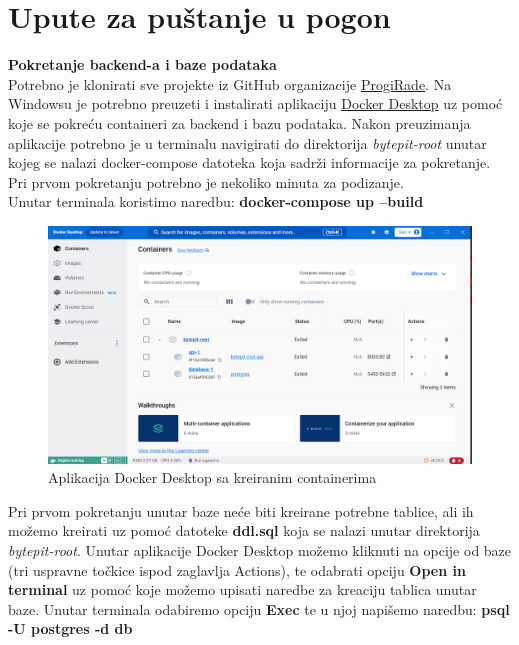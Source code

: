 		\section{Upute za puštanje u pogon}
		
			\textbf{Pokretanje backend-a i baze podataka}\\
			
				\noindent Potrebno je klonirati sve projekte iz GitHub organizacije \href{https://github.com/ProgiRade}{ProgiRade}. Na Windowsu je potrebno preuzeti i instalirati aplikaciju \href{https://www.docker.com/products/docker-desktop/}{Docker Desktop} uz pomoć koje se pokreću containeri za backend i bazu podataka. Nakon preuzimanja aplikacije potrebno je u terminalu navigirati do direktorija \textit{bytepit-root} unutar kojeg se nalazi docker-compose datoteka koja sadrži informacije za pokretanje. Pri prvom pokretanju potrebno je nekoliko minuta za podizanje.\\
				Unutar terminala koristimo naredbu: \textbf{docker-compose up --build}
				\begin{figure}[H]
					\includegraphics[scale=0.45]{slike/docker_desktop.PNG} 
					\centering
					\caption{Aplikacija Docker Desktop sa kreiranim containerima}
					\label{fig:docker_desktop}
				\end{figure}
				\noindent Pri prvom pokretanju unutar baze neće biti kreirane potrebne tablice, ali ih možemo kreirati uz pomoć datoteke \textbf{ddl.sql} koja se nalazi unutar direktorija \textit{bytepit-root}. Unutar aplikacije Docker Desktop možemo kliknuti na opcije od baze (tri uspravne točkice ispod zaglavlja Actions), te odabrati opciju \textbf{Open in terminal} uz pomoć koje možemo upisati naredbe za kreaciju tablica unutar baze. Unutar terminala odabiremo opciju \textbf{Exec} te u njoj napišemo naredbu: \textbf{psql -U postgres -d db}\\
